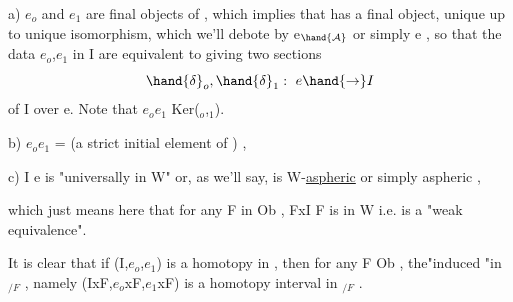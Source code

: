 a)  $e_o$ and $e_1$ are  final objects of  ,
which implies that  has a final object, unique up to unique isomorphism,
which we'll debote by e$_{\hand{\ensuremath{\mathcal{A}}}}$ or simply e , so that the data  $e_o$,$e_1$ in I are
equivalent to giving two sections
\[ \hand{\ensuremath{\delta}}_o , \hand{\ensuremath{\delta}}_1 :\ e \hand{\ensuremath{\to}} I \]
of I over e.  Note that  $e_o$\hand{\ensuremath{\cap}}$e_1$ \hand{\ensuremath{=}} Ker(\hand{\ensuremath{\delta}}$_o$,\hand{\ensuremath{\delta}}$_1$).

b)  $e_o$\hand{\ensuremath{\cap}}$e_1$ =  (a strict initial element of  ) ,

c)  I \hand{\ensuremath{\to}} e is "universally in W" or,  as we'll say, is W-\uline{aspheric} or
simply aspheric ,

which just means here that  for any  F in Ob  ,  FxI \hand{\ensuremath{\to}} F is in W i.e.
is a "weak equivalence".

It is clear that if (I,$e_o$,$e_1$) is a homotopy  in , then
for any F \hand{\ensuremath{\in}} Ob  ,  the"induced "in $_{/F}$ ,  namely (IxF,$e_o$xF,$e_1$xF)
is a homotopy interval in $_{/F}$ .

